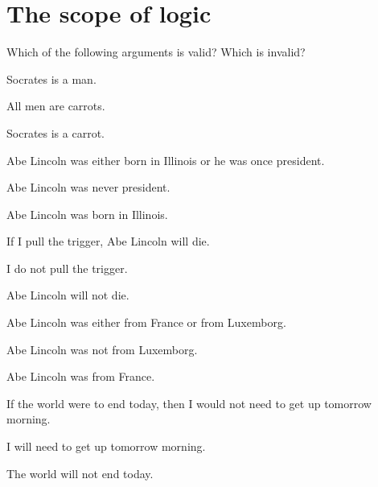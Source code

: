 \chapter{The scope of logic}
\problempart
Which of the following arguments is valid? Which is invalid?
\begin{compactlist}
\item\begin{earg}
\item Socrates is a man.
\item All men are carrots.
\item[\texttherefore]  Socrates is a carrot. \hfill {}
\end{earg}

\item\begin{earg}
\item Abe Lincoln was either born in Illinois or he was once president.
\item Abe Lincoln was never president.
\item[\texttherefore] Abe Lincoln was born in Illinois. \hfill {}
\end{earg}

\item\begin{earg}
\item If I pull the trigger, Abe Lincoln will die.
\item I do not pull the trigger.
\item[\texttherefore] Abe Lincoln will not die. \hfill {}
\end{earg}

\item\begin{earg}
\item Abe Lincoln was either from France or from Luxemborg.
\item Abe Lincoln was not from Luxemborg.
\item[\texttherefore] Abe Lincoln was from France. \hfill {}
\end{earg}

\item\begin{earg}
\item If the world were to end today, then I would not need to get up tomorrow morning.
\item I will need to get up tomorrow morning.
\item[\texttherefore] The world will not end today. \hfill {}
\end{earg}


\end{compactlist}
